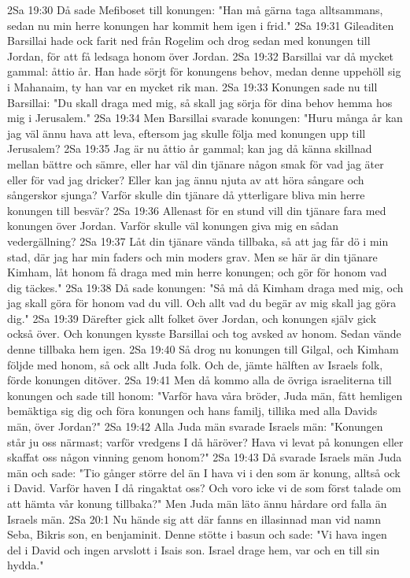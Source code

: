 2Sa 19:30  Då sade Mefiboset till konungen: "Han må gärna taga alltsammans, sedan nu min herre konungen har kommit hem igen i frid."
2Sa 19:31  Gileaditen Barsillai hade ock farit ned från Rogelim och drog sedan med konungen till Jordan, för att få ledsaga honom över Jordan.
2Sa 19:32  Barsillai var då mycket gammal: åttio år. Han hade sörjt för konungens behov, medan denne uppehöll sig i Mahanaim, ty han var en mycket rik man.
2Sa 19:33  Konungen sade nu till Barsillai: "Du skall draga med mig, så skall jag sörja för dina behov hemma hos mig i Jerusalem."
2Sa 19:34  Men Barsillai svarade konungen: "Huru många år kan jag väl ännu hava att leva, eftersom jag skulle följa med konungen upp till Jerusalem?
2Sa 19:35  Jag är nu åttio år gammal; kan jag då känna skillnad mellan bättre och sämre, eller har väl din tjänare någon smak för vad jag äter eller för vad jag dricker? Eller kan jag ännu njuta av att höra sångare och sångerskor sjunga? Varför skulle din tjänare då ytterligare bliva min herre konungen till besvär?
2Sa 19:36  Allenast för en stund vill din tjänare fara med konungen över Jordan. Varför skulle väl konungen giva mig en sådan vedergällning?
2Sa 19:37  Låt din tjänare vända tillbaka, så att jag får dö i min stad, där jag har min faders och min moders grav. Men se här är din tjänare Kimham, låt honom få draga med min herre konungen; och gör för honom vad dig täckes."
2Sa 19:38  Då sade konungen: "Så må då Kimham draga med mig, och jag skall göra för honom vad du vill. Och allt vad du begär av mig skall jag göra dig."
2Sa 19:39  Därefter gick allt folket över Jordan, och konungen själv gick också över. Och konungen kysste Barsillai och tog avsked av honom. Sedan vände denne tillbaka hem igen.
2Sa 19:40  Så drog nu konungen till Gilgal, och Kimham följde med honom, så ock allt Juda folk. Och de, jämte hälften av Israels folk, förde konungen ditöver.
2Sa 19:41  Men då kommo alla de övriga israeliterna till konungen och sade till honom: "Varför hava våra bröder, Juda män, fått hemligen bemäktiga sig dig och föra konungen och hans familj, tillika med alla Davids män, över Jordan?"
2Sa 19:42  Alla Juda män svarade Israels män: "Konungen står ju oss närmast; varför vredgens I då häröver? Hava vi levat på konungen eller skaffat oss någon vinning genom honom?"
2Sa 19:43  Då svarade Israels män Juda män och sade: "Tio gånger större del än I hava vi i den som är konung, alltså ock i David. Varför haven I då ringaktat oss? Och voro icke vi de som först talade om att hämta vår konung tillbaka?" Men Juda män läto ännu hårdare ord falla än Israels män.
2Sa 20:1  Nu hände sig att där fanns en illasinnad man vid namn Seba, Bikris son, en benjaminit. Denne stötte i basun och sade: "Vi hava ingen del i David och ingen arvslott i Isais son. Israel drage hem, var och en till sin hydda."
